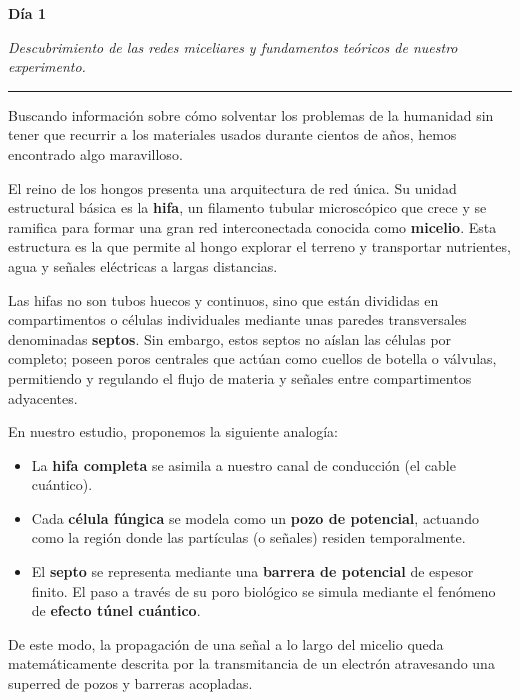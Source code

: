 \documentclass[a4paper,12pt]{article}
\begin{document}
\newcommand{\entrada}[2]{
\vspace{1cm}

\noindent
{\large\textbf{Día #1}}

\vspace{0.15cm}

{\itshape #2}

\vspace{0.3cm}

\hrule

\vspace{0.5cm}
}

\entrada{1}{Descubrimiento de las redes miceliares y fundamentos teóricos de nuestro experimento.}

Buscando información sobre cómo solventar los problemas de la humanidad sin tener que recurrir a los materiales usados durante cientos de años, hemos encontrado algo maravilloso.

El reino de los hongos presenta una arquitectura de red única. Su unidad estructural básica es la \textbf{hifa}, un filamento tubular microscópico que crece y se ramifica para formar una gran red interconectada conocida como \textbf{micelio}. Esta estructura es la que permite al hongo explorar el terreno y transportar nutrientes, agua y señales eléctricas a largas distancias.

Las hifas no son tubos huecos y continuos, sino que están divididas en compartimentos o células individuales mediante unas paredes transversales denominadas \textbf{septos}. Sin embargo, estos septos no aíslan las células por completo; poseen poros centrales que actúan como cuellos de botella o válvulas, permitiendo y regulando el flujo de materia y señales entre compartimentos adyacentes.

En nuestro estudio, proponemos la siguiente analogía:
\begin{itemize}
    \item La \textbf{hifa completa} se asimila a nuestro canal de conducción (el cable cuántico).
    \item Cada \textbf{célula fúngica} se modela como un \textbf{pozo de potencial}, actuando como la región donde las partículas (o señales) residen temporalmente.
    \item El \textbf{septo} se representa mediante una \textbf{barrera de potencial} de espesor finito. El paso a través de su poro biológico se simula mediante el fenómeno de \textbf{efecto túnel cuántico}.
\end{itemize}

De este modo, la propagación de una señal a lo largo del micelio queda matemáticamente descrita por la transmitancia de un electrón atravesando una superred de pozos y barreras acopladas.
\end{document}
